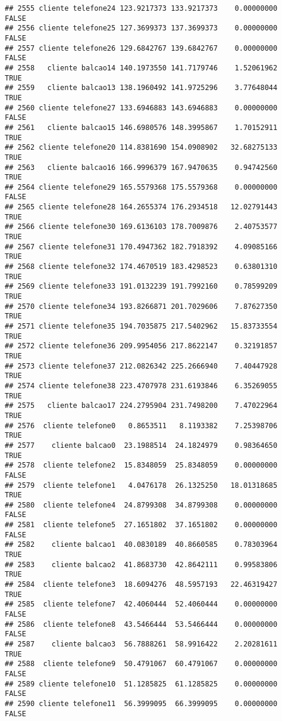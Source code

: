 \documentclass[
]{article}
\begin{document}
\begin{verbatim}
## 2555 cliente telefone24 123.9217373 133.9217373    0.00000000    FALSE
## 2556 cliente telefone25 127.3699373 137.3699373    0.00000000    FALSE
## 2557 cliente telefone26 129.6842767 139.6842767    0.00000000    FALSE
## 2558   cliente balcao14 140.1973550 141.7179746    1.52061962     TRUE
## 2559   cliente balcao13 138.1960492 141.9725296    3.77648044     TRUE
## 2560 cliente telefone27 133.6946883 143.6946883    0.00000000    FALSE
## 2561   cliente balcao15 146.6980576 148.3995867    1.70152911     TRUE
## 2562 cliente telefone20 114.8381690 154.0908902   32.68275133     TRUE
## 2563   cliente balcao16 166.9996379 167.9470635    0.94742560     TRUE
## 2564 cliente telefone29 165.5579368 175.5579368    0.00000000    FALSE
## 2565 cliente telefone28 164.2655374 176.2934518   12.02791443     TRUE
## 2566 cliente telefone30 169.6136103 178.7009876    2.40753577     TRUE
## 2567 cliente telefone31 170.4947362 182.7918392    4.09085166     TRUE
## 2568 cliente telefone32 174.4670519 183.4298523    0.63801310     TRUE
## 2569 cliente telefone33 191.0132239 191.7992160    0.78599209     TRUE
## 2570 cliente telefone34 193.8266871 201.7029606    7.87627350     TRUE
## 2571 cliente telefone35 194.7035875 217.5402962   15.83733554     TRUE
## 2572 cliente telefone36 209.9954056 217.8622147    0.32191857     TRUE
## 2573 cliente telefone37 212.0826342 225.2666940    7.40447928     TRUE
## 2574 cliente telefone38 223.4707978 231.6193846    6.35269055     TRUE
## 2575   cliente balcao17 224.2795904 231.7498200    7.47022964     TRUE
## 2576  cliente telefone0   0.8653511   8.1193382    7.25398706     TRUE
## 2577    cliente balcao0  23.1988514  24.1824979    0.98364650     TRUE
## 2578  cliente telefone2  15.8348059  25.8348059    0.00000000    FALSE
## 2579  cliente telefone1   4.0476178  26.1325250   18.01318685     TRUE
## 2580  cliente telefone4  24.8799308  34.8799308    0.00000000    FALSE
## 2581  cliente telefone5  27.1651802  37.1651802    0.00000000    FALSE
## 2582    cliente balcao1  40.0830189  40.8660585    0.78303964     TRUE
## 2583    cliente balcao2  41.8683730  42.8642111    0.99583806     TRUE
## 2584  cliente telefone3  18.6094276  48.5957193   22.46319427     TRUE
## 2585  cliente telefone7  42.4060444  52.4060444    0.00000000    FALSE
## 2586  cliente telefone8  43.5466444  53.5466444    0.00000000    FALSE
## 2587    cliente balcao3  56.7888261  58.9916422    2.20281611     TRUE
## 2588  cliente telefone9  50.4791067  60.4791067    0.00000000    FALSE
## 2589 cliente telefone10  51.1285825  61.1285825    0.00000000    FALSE
## 2590 cliente telefone11  56.3999095  66.3999095    0.00000000    FALSE

\end{verbatim}
\end{document}
